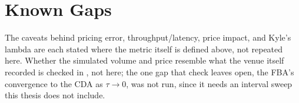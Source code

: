 \section{Known Gaps}

The caveats behind pricing error, throughput/latency, price impact, and
Kyle's lambda are each stated where the metric itself is defined above,
not repeated here. Whether the simulated volume and price resemble what
the venue itself recorded is checked in ,
not here; the one gap that check leaves open, the FBA's convergence to the
CDA as $\tau \to 0$, was not run, since it needs an interval sweep this
thesis does not include.
